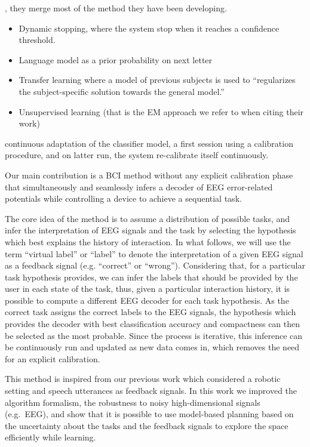 \cite{kindermans2014integrating}, they merge most of the method they have been developing.
\begin{itemize}
    \item Dynamic stopping, where the system stop when it reaches a confidence threshold.
    \item Language model as a prior probability on next letter
    \item Transfer learning where a model of previous subjects is used to ``regularizes the subject-specific solution towards the general model.''
    \item Unsupervised learning (that is the EM approach we refer to when citing their work)
\end{itemize}

\cite{schettini2014self} continuous adaptation of the classifier model, a first session using a calibration procedure, and on latter run, the system re-calibrate itself continuously.


Our main contribution is a BCI method without any explicit calibration phase that simultaneously and seamlessly infers a decoder of EEG error-related potentials while controlling a device to achieve a sequential task.

The core idea of the method is to assume a distribution of possible tasks, and infer the interpretation of EEG signals and the task by selecting the hypothesis which best explains the history of interaction. In what follows, we will use the term ``virtual label'' or ``label'' to denote the interpretation of a given EEG signal as a feedback signal (e.g. ``correct'' or ``wrong''). Considering that, for a particular task hypothesis provides, we can infer the labels that should be provided by the user in each state of the task, thus, given a particular interaction history, it is possible to compute a different EEG decoder for each task hypothesis. As the correct task assigns the correct labels to the EEG signals, the hypothesis which provides the decoder with best classification accuracy and compactness can then be selected as the most probable. Since the process is iterative, this inference can be continuously run and updated as new data comes in, which removes the need for an explicit calibration.

This method is inspired from our previous work \cite{grizou2013robot} which considered a robotic setting and speech utterances as feedback signals. In this work we improved the algorithm formalism, the robustness to noisy high-dimensional signals (e.g.\ EEG), and show that it is possible to use model-based planning based on the uncertainty about the tasks and the feedback signals to explore the space efficiently while learning.

